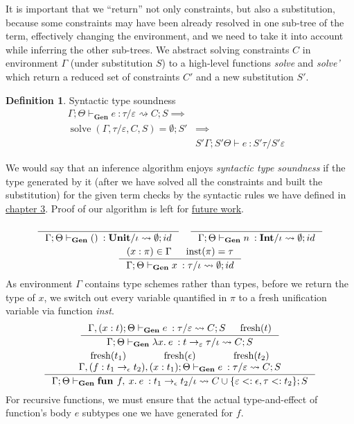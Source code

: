 \documentclass[declaration,shortabstract]{iithesis}
\theoremstyle{definition} \newtheorem{definition}{Definition}[section]
\newcommand{\types}[4][\Gamma;\Theta]{\ensuremath{{{#1} \vdash {#2} \: : {#3}/{#4}}}}
\newcommand{\gens}[6][\Gamma;\Theta]{\ensuremath{{{#1} \vdash_\textbf{Gen} {#2} \: : {#3}/{#4}} \rightsquigarrow {#5};{#6}}}
\newcommand{\arrow}[3]{{#1}\rightarrow_{#2}{#3}}
\newcommand{\lam}[1][x]{\ensuremath{\lambda #1.\:}}
\newcommand{\fun}[1][f,\:x]{\ensuremath{\textbf{fun } #1.\:}}
\newcommand{\fresh}[1]{\ensuremath{\operatorname{fresh}({#1})}}
\begin{document}
It is important that we ``return'' not only constraints, but also a substitution, 
because some constraints may have been already resolved in
one sub-tree of the term, effectively changing the environment,
and we need to take it into account while inferring the other sub-trees.
We abstract solving constraints $C$ in environment $\Gamma$ (under substitution $S$) to
a high-level functions \textit{solve} and \textit{solve'} which return a reduced set of constraints $C'$ and
a new substitution $S'$. 
\theoremstyle{definition} 
\begin{definition}{Syntactic type soundness}
   $$
   \begin{aligned}
    \gens{e}{\tau}{\varepsilon}{C}{S} \implies& &\\
    \operatorname{solve}(\Gamma,\tau/\varepsilon, C, S) = \emptyset; S' & \implies & \\
      &\types[S'\Gamma;S'\Theta]{e}{S'\tau}{S'\varepsilon} &
    \end{aligned}
    $$
\end{definition}
We would say that an inference algorithm enjoys \textit{syntactic type soundness}
if the type generated by it (after we have solved all the constraints and built the substitution)
for the given term checks by the syntactic rules we have defined in \hyperlink{chapter.3}{chapter 3}.
Proof of our algorithm is left for \hyperlink{chapter.6}{future work}.

\setlength{\jot}{12pt}

\begin{gather*}
    \inference {}{\gens{()}{\textbf{Unit}}{\iota}{\emptyset}{id}}
    \quad
    \inference {}{\gens{n}{\textbf{Int}}{\iota}{\emptyset}{id}} {}
\\
    \inference {
        (x : \pi) \in \Gamma & \operatorname{inst}(\pi) = \tau
    }{
        \gens{x}{\tau}{\iota}{\emptyset}{id}
    }
\end{gather*}
As environment $\Gamma$ contains type schemes rather than types, before we return the type of $x$,
we switch out every variable quantified in $\pi$ to a fresh unification variable
via function \textit{inst}.
\begin{gather*}
     \inference{
        \gens[\Gamma, (x : t); \Theta]{e}{\tau}{\varepsilon}{C}{S} &
        \fresh{t}
    }{
        \gens{\lam e}{\arrow{t}{\varepsilon}{\tau}}{\iota}{C}{S}
    }
\\
    \inference{
        \fresh{t_1} &
        \fresh{\epsilon} &
        \fresh{t_2} \\
        \gens[\Gamma, (f : \arrow{t_1}{\epsilon}{t_2}),(x : t_1); \Theta]{e}{\tau}{\varepsilon}{C}{S}
    }{
        \gens{\fun e}{\arrow{t_1}{\epsilon}{t_2}}{\iota}
        {C \cup \{\varepsilon <: \epsilon, \tau <: t_2 \}}{S}
    }
\end{gather*}
For recursive functions, we must ensure that the actual type-and-effect of function's body $e$
subtypes one we have generated for $f$.
\end{document}

